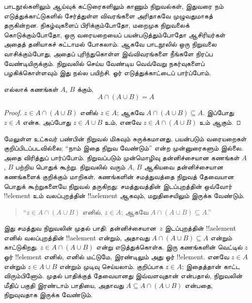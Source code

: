 \documentclass[../../../include/open-logic-section]{subfiles}
\begin{document}

பாடநூல்களிலும் ஆய்வுக் கட்டுரைகளிலும் காணும் நிறுவல்கள்,
இதுவரை நம் எடுத்துக்காட்டுகளில் சேர்த்துள்ள விவரங்களை
அரிதாகவே முழுவதுமாகத் தருகின்றன. நிகழ்வுகளைப் பிரிக்கும்போதோ,
மறைமுக நிறுவலைக் கொடுக்கும்போதோ, ஒரு வரையறையைப்
பயன்படுத்தும்போதோ ஆசிரியர்கள் அதைத் தனியாகச் சுட்டாமல்
போகலாம். ஆகவே பாடநூலில் ஒரு நிறுவலை வாசிக்கும்போது,
அதைப் புரிந்துகொள்ள இவ்விவரங்களை நீங்களே நிரப்ப
வேண்டியிருக்கும். நிறுவலில் செய்ய வேண்டிய வெவ்வேறு
நகர்வுகளைப் பழகிக்கொள்ளவும் இது நல்ல பயிற்சி.
ஓர் எடுத்துக்காட்டைப் பார்ப்போம்.

\begin{prop}[உட்கவர் பண்பு]
எல்லாக் கணங்கள் $A$, $B$ க்கும்,
\[
A \cap (A \cup B) = A
\]
\end{prop}

\begin{proof}
$z \in A \cap (A \cup B)$ எனில் $z \in A$;
ஆகவே $A \cap (A \cup B) \subseteq A$. இப்போது
$z \in A$ என்க. அப்போது $z \in A \cup B$
உம், எனவே $z \in A \cap (A \cup B)$ உம் ஆகும்.
\end{proof}

மேலுள்ள உட்கவர் பண்பின் நிறுவல் மிகவும் சுருக்கமானது.
பயன்படும் வரையறைகள் குறிப்பிடப்படவில்லை; ``நாம் இதை
நிறுவ வேண்டும்'' என்ற முன்னுரைகளும் இல்லை. அதை
விரித்துப் பார்ப்போம். நிறுவப்படும் முன்மொழிவு தன்னிச்சையான
கணங்கள் $A$, $B$ பற்றிய பொதுக் கூற்று. நிறுவலில் வரும்
$A$, $B$ ஆகியவை தன்னிச்சையான கணங்களைக் குறிக்கும்
மாறிகள். கணங்களின் சமத்துவத்தை நிறுவத் தேவையான
பொதுக் கூற்றுகளையே நிறுவல் தருகிறது: சமத்துவத்தின்
இடப்புறத்தின் ஒவ்வோர் !!{element} உம் வலப்புறத்தின்
!!a{element} ஆகவும், மறுதிசையிலும் இருக்க வேண்டும்.

\begin{quote}
``$z \in A \cap (A \cup B)$ எனில், $z \in A$;
  ஆகவே $A \cap (A \cup B) \subseteq A$.''
\end{quote}

இது சமத்துவ நிறுவலின் முதல் பாதி: தன்னிச்சையான~$z$
இடப்புறத்தின் !!a{element} எனில் வலப்புறத்தின்
!!a{element} என்றும், அதாவது
$A \cap (A \cup B) \subseteq A$ என்றும் காட்டுகிறது.
$z \in A \cap (A \cup B)$ என்று எடுத்துக்கொள்க.
இரு கணங்களின் வெட்டில் $z$ ஓர் !!{element} எனில்,
எனில் மட்டுமே, இரண்டிலும் அது ஓர் !!{element}.
எனவே $z \in A$ என்றும் $z \in A \cup B$
என்றும் முடிவு செய்யலாம். குறிப்பாக $z \in A$;
இதைத்தான் காட்ட விரும்பினோம். முதல் பாதிக்குத்
தேவையானது இவ்வளவுதான் என்பதால், நிறுவலின் மீதிப்
பகுதி இரண்டாம் பாதியை, அதாவது
$A \subseteq A \cap (A \cup B)$ என்பதை,
நிறுவுவதாக இருக்க வேண்டும்.
\end{document}
